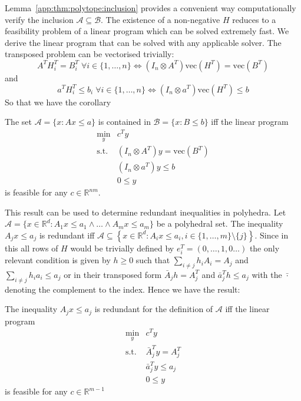 %
\noindent Lemma~\ref{app:thm:polytope:inclusion} provides a convenient way computationally verify the inclusion $\mathcal A\subseteq\mathcal B$.
%
The existence of a non-negative $H$ reduces to a feasibility problem of a linear program which can be solved extremely fast.
%
We derive the linear program that can be solved with any applicable solver. 
%
The transposed problem can be vectorised trivially:
%
\begin{equation}
	A^TH_i^T=B_i^T\; \forall i\in\{1,\dots,n\} \Leftrightarrow \left(I_n\otimes A^T\right) \text{vec}(H^T) = \text{vec}(B^T)
\end{equation}
%
and 
%
\begin{equation}
	a^TH_i^T\leq b_i\; \forall i\in\{1,\dots,n\} \Leftrightarrow \left(I_n\otimes a^T\right) \text{vec}(H^T) \leq b
\end{equation}
%
So that we have the corollary
%
\begin{cor}\label{cor:containment:of:polytope:in:polytope}
The set $\mathcal A = \{x:Ax\leq a\}$ is contained in $\mathcal B = \{x:B\leq b\}$ iff the linear program
%
\begin{equation}\begin{array}{rl}
	\min_{y} & c^Ty \\
	\text{s.t.} & \left(I_n\otimes A^T\right) y = \text{vec}(B^T)\\
	& \left(I_n\otimes a^T\right) y \leq b\\
	& 0\leq y
\end{array}\end{equation}
%
is feasible for any $c\in\mathbb R^{nm}$.
\end{cor}
%
\noindent This result can be used to determine redundant inequalities in polyhedra.
%
Let $\mathcal A = \{x\in\mathbb R^d: A_1 x \leq a_1\wedge\dots\wedge A_m x\leq a_m\}$ be a polyhedral set.
%
The inequality $A_j x\leq a_j$ is redundant iff $\mathcal A\subseteq \left\{x\in\mathbb R^d: A_i x\leq a_i, i\in\{1,\dots,m\}\setminus\{j\} \right\}$.
%
Since in this all rows of $H$ would be trivially defined by $e_i^T=(0,\dots,1,0\dots)$ the only relevant condition is given by $h\geq0$ such that $\sum_{i\neq j} h_i A_i = A_j$ and $\sum_{i\neq j} h_i a_i \leq a_j$ or in their transposed form $\bar A_j h =A_j^T$ and $\bar a_j^T h\leq a_j$  with the $\bar\cdot$ denoting the complement to the index.
%
Hence we have the result:
%
\begin{cor}
The inequality $A_j x\leq a_j$ is redundant for the definition of $\mathcal A$ iff the linear program
%
\begin{equation}
	\begin{array}{rl}
	\min_y & c^Ty\\
	\text{s.t.} & \bar A_j^T y = A_j^T \\
	& \bar a_j^Ty\leq a_j\\
	& 0\leq y
	\end{array}
\end{equation}
%
is feasible for any $c\in\mathbb R^{m-1}$
\end{cor}
